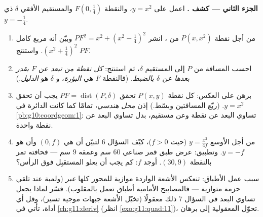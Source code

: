 \begin{problem}
\medskip
\noindent\textbf{الجزء الثاني --- كشف .}
اعمل على  $y = x^2$، والنقطة
$F\left(0, \frac14\right)$ والمستقيم الأفقي $\delta$ ذي
 $y = -\frac14$.
\begin{enumerate}[resume]
  \item من أجل نقطة $P(x, x^2)$ من ، انشر
        $PF^2 = x^2 + \left(x^2 - \frac14\right)^2$ وبيّن أنه
        مربع كامل $\left(x^2 + \frac14\right)^2$.
        واستنتج $PF$.
  \item احسب المسافة من $P$ إلى المستقيم $\delta$، ثم
        استنتج: \emph{كل نقطة من  تبعد عن
        $F$ بقدر بعدها عن $\delta$ بالضبط}. (فالنقطة $F$ هي
        \emph{البؤرة}، و $\delta$ هو
        \emph{الدليل}.)
  \item برهن على العكس: كل نقطة $P(x, y)$ تحقق
        $PF = \operatorname{dist}(P, \delta)$ يجب أن تحقق
        $y = x^2$. (ربّع المسافتين وبسّط.) إذن
         \emph{محل هندسي}، تمامًا كما كانت الدائرة
        في \cref{pb:g10:coordgeom:1}: تساوي البعد عن نقطة
        وعن مستقيم، بدل تساوي البعد عن نقطة واحدة.
  \item من أجل  الأوسع $y = \frac{x^2}{4f}$ (حيث
        $f > 0$)، كيّف السؤال 6 لتبيّن أن  هي
        $(0, f)$ وأن  هو $y = -f$. وتطبيق: عرض
        طبق قمر صناعي $60$ سم وعمقه $9$ سم --- فحافته
        تمر بالنقطة $(30, 9)$. أوجد $f$: كم يجب أن يعلو
        المستقبِل فوق الرأس؟
  \item سبب عمل الأطباق: تنعكس الأشعة الواردة موازية
        للمحور كلها \emph{عبر } (ولمبة عند
         تلقي حزمة متوازية --- فالمصابيح الأمامية
        أطباق تعمل بالمقلوب). فسّر لماذا يجعل تساوي البعد
        في السؤال 7 ذلك معقولًا (تخيّل الأشعة جبهات موجية
        تسير)، وقل أي أداة، تأتي في
        \cref{ch:g11:deriv} (انظر \cref{exo:g11:quad:11})، تحوّل
        المعقولية إلى برهان.
\end{enumerate}


\end{problem}
